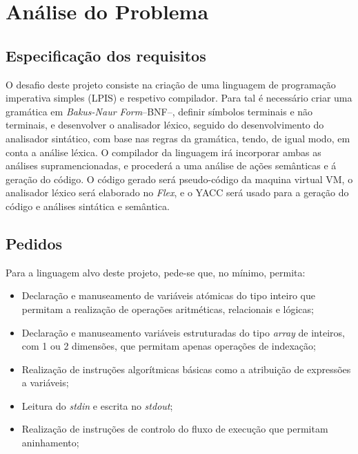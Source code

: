 \chapter{Análise do Problema}
\label{cap:analise}


\section{Especificação dos requisitos}
\label{sec:especificacao:analise}

O desafio deste projeto consiste na criação de uma linguagem de programação
imperativa simples (LPIS) e respetivo compilador.  Para tal é necessário criar
uma gramática em \emph{Bakus-Naur Form}--BNF--, definir símbolos terminais e não
terminais, e desenvolver o analisador léxico, seguido do desenvolvimento do
analisador sintático, com base nas regras da gramática, tendo, de igual modo, em conta
a análise léxica. O compilador da linguagem irá incorporar ambas as análises
supramencionadas, e procederá a uma análise de ações semânticas e á geração do
código.  O código gerado será pseudo-código da maquina virtual VM, o analisador
léxico será elaborado no \emph{Flex}, e o YACC será usado para a geração do
código e análises sintática e semântica.   


\section{Pedidos}

Para a linguagem alvo deste projeto, pede-se que, no mínimo, permita:


\begin{itemize}
\item Declaração e manuseamento de variáveis atómicas do tipo inteiro que
	permitam a realização de operações aritméticas, relacionais e lógicas;
\item Declaração e manuseamento variáveis estruturadas do tipo \emph{array} de
	inteiros, com 1 ou 2 dimensões, que permitam apenas operações de indexação;
\item Realização de instruções algorítmicas básicas como a atribuição de
	expressões a variáveis;
\item Leitura do \emph{stdin} e escrita no \emph{stdout};
\item Realização de instruções de controlo do fluxo de execução que permitam
	aninhamento;
\end{itemize}

